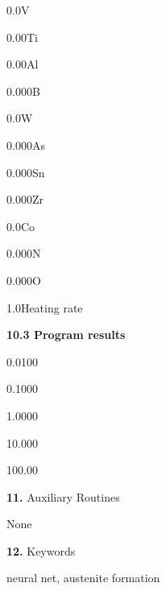 \item {0.0}\indent	V
\item {0.00}\indent	Ti
\item {0.00}\indent     Al
\item {0.000}\indent   B
\item {0.0}\indent     W
\item {0.000}\indent	As
\item {0.000}\indent	Sn
\item {0.000}\indent	Zr
\item {0.0}\indent	Co
\item {0.000}\indent	N
\item {0.000}\indent	O
\item {1.0}\indent	Heating rate
\item {} {\bf 10.3 Program results}
\bigskip
\item {0.0100}  
\item {0.1000}  
\item {1.0000}  
\item {10.000}  
\item {100.00}  
\item{\bf 11.} {\largeb  Auxiliary Routines}
\bigskip
\item {} None
\item{\bf 12.} {\largeb  Keywords}
\bigskip
\item {} neural net, austenite formation
\bye

